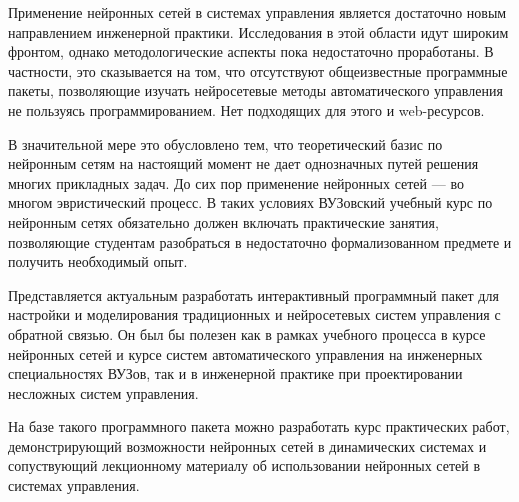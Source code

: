 


Применение нейронных сетей в системах управления является достаточно
новым направлением инженерной практики.  Исследования в этой области
идут широким фронтом, однако методологические аспекты пока
недостаточно проработаны.  В частности, это сказывается на том, что
отсутствуют общеизвестные программные пакеты, позволяющие изучать
нейросетевые методы автоматического управления не пользуясь
программированием.  Нет подходящих для этого и web-ресурсов.

В значительной мере это обусловлено тем, что теоретический базис по
нейронным сетям на настоящий момент не дает однозначных путей решения
многих прикладных задач.  До сих пор применение нейронных сетей --- во
многом эвристический процесс.  В таких условиях ВУЗовский учебный курс
по нейронным сетях обязательно должен включать практические занятия,
позволяющие студентам разобраться в недостаточно формализованном
предмете и получить необходимый опыт.

Представляется актуальным разработать интерактивный программный пакет
для настройки и моделирования традиционных и нейросетевых систем
управления с обратной связью.  Он был бы полезен как в рамках учебного
процесса в курсе нейронных сетей и курсе систем автоматического
управления на инженерных специальностях ВУЗов, так и в инженерной
практике при проектировании несложных систем управления.

На базе такого программного пакета можно разработать курс практических
работ, демонстрирующий возможности нейронных сетей в динамических
системах и сопуствующий лекционному материалу об использовании
нейронных сетей в системах управления.

